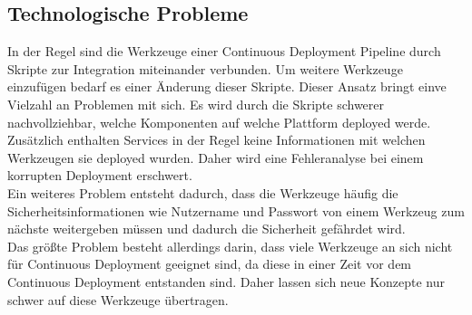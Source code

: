 \subsection{Technologische Probleme}
In der Regel sind die Werkzeuge einer Continuous Deployment Pipeline durch Skripte zur Integration miteinander verbunden. Um weitere Werkzeuge einzufügen bedarf es einer Änderung dieser Skripte. Dieser Ansatz bringt einve Vielzahl an Problemen mit sich. Es wird durch die Skripte schwerer nachvollziehbar, welche Komponenten auf welche Plattform deployed werde. Zusätzlich enthalten Services in der Regel keine Informationen mit welchen Werkzeugen sie deployed wurden. Daher wird eine Fehleranalyse bei einem korrupten Deployment erschwert.\\
Ein weiteres Problem entsteht dadurch, dass die Werkzeuge häufig die Sicherheitsinformationen wie Nutzername und Passwort von einem Werkzeug zum nächste weitergeben müssen und dadurch die Sicherheit gefährdet wird. \\
Das größte Problem besteht allerdings darin, dass viele Werkzeuge an sich nicht für Continuous Deployment geeignet sind, da diese in einer Zeit vor dem Continuous Deployment entstanden sind. Daher lassen sich neue Konzepte nur schwer auf diese Werkzeuge übertragen.